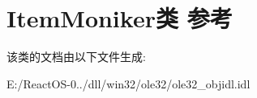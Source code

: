 \hypertarget{class_item_moniker}{}\section{Item\+Moniker类 参考}
\label{class_item_moniker}


该类的文档由以下文件生成\+:\begin{DoxyCompactItemize}
\item 
E\+:/\+React\+O\+S-\/0../dll/win32/ole32/ole32\+\_\+objidl.\+idl\end{DoxyCompactItemize}
